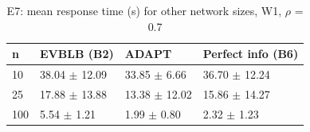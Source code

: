 \begin{table}[t]
\centering
\footnotesize
\caption{E7: mean response time (s) for other network sizes, W1, $\rho$ = 0.7}
\label{tab:e7}
\begin{tabular}{llll}
\toprule
n & EVBLB (B2) & ADAPT & Perfect info (B6) \\
\midrule
10 & 38.04 $\pm$ 12.09 & 33.85 $\pm$ 6.66 & 36.70 $\pm$ 12.24 \\
25 & 17.88 $\pm$ 13.88 & 13.38 $\pm$ 12.02 & 15.86 $\pm$ 14.27 \\
100 & 5.54 $\pm$ 1.21 & 1.99 $\pm$ 0.80 & 2.32 $\pm$ 1.23 \\
\bottomrule
\end{tabular}
\end{table}
